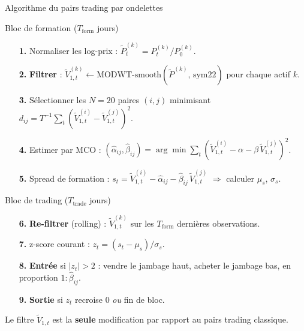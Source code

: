 \documentclass[10pt,aspectratio=169]{beamer}
\begin{document}
\begin{frame}{Algorithme du pairs trading par ondelettes}
  \scriptsize
  \begin{block}{Bloc de formation ($T_{\text{form}}$ jours)}
    \begin{enumerate}\setlength{\itemsep}{1pt}
      \item[\textbf{1.}] Normaliser les log-prix : $\tilde{P}_t^{(k)} = P_t^{(k)}/P_0^{(k)}$.
      \item[\textbf{2.}] \textbf{Filtrer} : $\widetilde{V}_{1,t}^{(k)} \leftarrow \text{MODWT-smooth}(\tilde{P}^{(k)},\,\text{sym22})$ pour chaque actif $k$.
      \item[\textbf{3.}] Sélectionner les $N=20$ paires $(i,j)$ minimisant
            $d_{ij} = T^{-1}\sum_t(\widetilde{V}_{1,t}^{(i)} - \widetilde{V}_{1,t}^{(j)})^2$.
      \item[\textbf{4.}] Estimer par MCO : $(\hat\alpha_{ij},\hat\beta_{ij}) =
            \arg\min\sum_t(\widetilde{V}_{1,t}^{(i)} - \alpha - \beta\,\widetilde{V}_{1,t}^{(j)})^2$.
      \item[\textbf{5.}] Spread de formation :
            $s_t = \widetilde{V}_{1,t}^{(i)} - \hat\alpha_{ij} - \hat\beta_{ij}\,\widetilde{V}_{1,t}^{(j)}$
            $\Rightarrow$ calculer $\mu_s$, $\sigma_s$.
    \end{enumerate}
  \end{block}

  \vskip2pt
  \begin{block}{Bloc de trading ($T_{\text{trade}}$ jours)}
    \begin{enumerate}\setlength{\itemsep}{1pt}
      \item[\textbf{6.}] \textbf{Re-filtrer} (rolling) :
            $\widetilde{V}_{1,t}^{(k)}$ sur les $T_{\text{form}}$ dernières observations.
      \item[\textbf{7.}] z-score courant :
            $z_t = (s_t - \mu_s)/\sigma_s$.
      \item[\textbf{8.}] \textbf{Entrée} si $|z_t| > 2$ : vendre le jambage haut,
            acheter le jambage bas, en proportion $1 : \hat\beta_{ij}$.
      \item[\textbf{9.}] \textbf{Sortie} si $z_t$ recroise $0$ \emph{ou} fin de bloc.
    \end{enumerate}
  \end{block}

  \vskip2pt
  \centering\footnotesize
  Le filtre $\widetilde{V}_{1,t}$ est la \textbf{seule} modification par rapport au pairs trading classique.
\end{frame}
\end{document}
